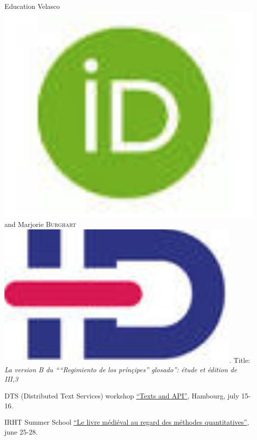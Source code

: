 \begin{rubric}{Education}
{                        Velasco}\href{https://orcid.org/0000-0002-3848-9230}{\includegraphics[scale=0.025]{img/orcid.png}} and Marjorie \textsc{Burghart}\href{https://www.idref.fr/178995819}{\textsuperscript{\includegraphics[scale=0.025]{img/idref.png}}}. Title: \textit{La
                        version B du ````Regimiento de los
                        prínçipes'' glosado'': étude et édition de
                        III,3}
                    
                                \entry*
                             DTS (Distributed Text Services) workshop \href{https://distributed-text-services.github.io/workshops/events/2019-hamburg/}{\enquote{Texts and API}}, Hambourg, july
                        15-16.
                    
                                \entry*
                            IRHT Summer School \href{https://www.irht.cnrs.fr/?q=fr/agenda/le-livre-medieval-au-regard-des-methodes-quantitatives-0}{\enquote{Le livre médiéval au regard des méthodes
                        quantitatives}}, june 25-28.
                    

\end{rubric}
